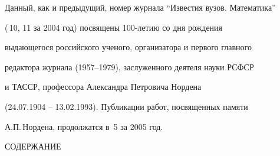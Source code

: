 




\newcommand{\tl}[3]{\medskip\noindent{\bf#1}\ #2 \dotfill #3 \par} 


\pagestyle{empty}









\par


\par


\par


\bigskip





Данный, как и предыдущий, номер журнала ``Известия вузов. Математика''


(\No\No\,10, 11 за 2004 год) посвящены 100-летию со дня рождения


выдающегося российского ученого, организатора и первого главного


редактора журнала (1957--1979), заслуженного деятеля науки РСФСР


и ТАССР, профессора Александра Петровича Нордена


(24.07.1904 -- 13.02.1993). Публикации работ, посвященных памяти


А.П.\,Нордена, продолжатся в \No\,5 за 2005 год.


\bigskip








\centerline{\Large СОДЕРЖАНИЕ}


\bigskip


\bigskip













